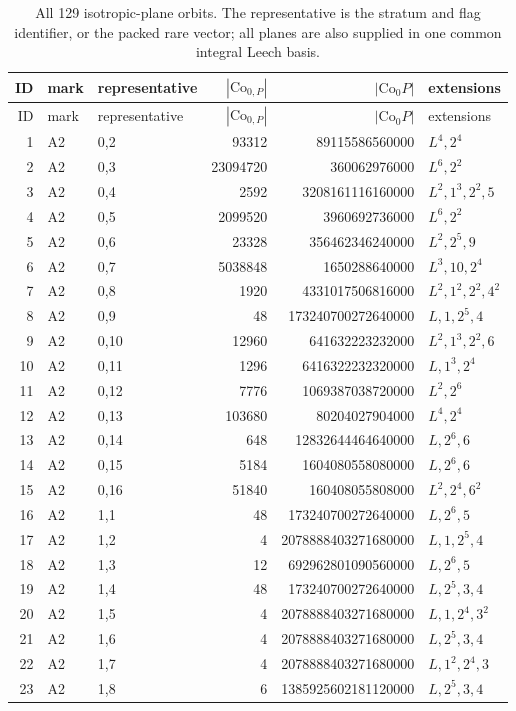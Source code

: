 \begin{longtable}{rllrrl}
\caption{All 129 isotropic-plane orbits. The representative is the stratum and flag identifier, or the packed rare vector; all planes are also supplied in one common integral Leech basis.}\label{tab:B129}\\
ID&mark&representative&$|\mathrm{Co}_{0,P}|$&$|\mathrm{Co}_0P|$&extensions\\\hline\endfirsthead
ID&mark&representative&$|\mathrm{Co}_{0,P}|$&$|\mathrm{Co}_0P|$&extensions\\\hline\endhead
1&A2&0,2&93312&89115586560000&$L^{4},2^{4}$\\
2&A2&0,3&23094720&360062976000&$L^{6},2^{2}$\\
3&A2&0,4&2592&3208161116160000&$L^{2},1^{3},2^{2},5$\\
4&A2&0,5&2099520&3960692736000&$L^{6},2^{2}$\\
5&A2&0,6&23328&356462346240000&$L^{2},2^{5},9$\\
6&A2&0,7&5038848&1650288640000&$L^{3},10,2^{4}$\\
7&A2&0,8&1920&4331017506816000&$L^{2},1^{2},2^{2},4^{2}$\\
8&A2&0,9&48&173240700272640000&$L,1,2^{5},4$\\
9&A2&0,10&12960&641632223232000&$L^{2},1^{3},2^{2},6$\\
10&A2&0,11&1296&6416322232320000&$L,1^{3},2^{4}$\\
11&A2&0,12&7776&1069387038720000&$L^{2},2^{6}$\\
12&A2&0,13&103680&80204027904000&$L^{4},2^{4}$\\
13&A2&0,14&648&12832644464640000&$L,2^{6},6$\\
14&A2&0,15&5184&1604080558080000&$L,2^{6},6$\\
15&A2&0,16&51840&160408055808000&$L^{2},2^{4},6^{2}$\\
16&A2&1,1&48&173240700272640000&$L,2^{6},5$\\
17&A2&1,2&4&2078888403271680000&$L,1,2^{5},4$\\
18&A2&1,3&12&692962801090560000&$L,2^{6},5$\\
19&A2&1,4&48&173240700272640000&$L,2^{5},3,4$\\
20&A2&1,5&4&2078888403271680000&$L,1,2^{4},3^{2}$\\
21&A2&1,6&4&2078888403271680000&$L,2^{5},3,4$\\
22&A2&1,7&4&2078888403271680000&$L,1^{2},2^{4},3$\\
23&A2&1,8&6&1385925602181120000&$L,2^{5},3,4$\\

\end{longtable}

